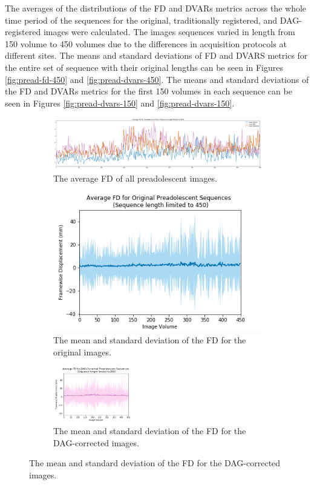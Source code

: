 The averages of the distributions of the FD and DVARs metrics across the whole time period of the sequences for the original, traditionally registered, and DAG-registered images were calculated. The images sequences varied in length from 150 volume to 450 volumes due to the differences in acquisition protocols at different sites. The means and standard deviations of FD and DVARS metrics for the entire set of sequence with their original lengths can be seen in Figures \ref{fig:pread-fd-450} and \ref{fig:pread-dvars-450}. The means and standard deviations of the FD and DVARs metrics for the first 150 volumes in each sequence can be seen in Figures \ref{fig:pread-dvars-150} and \ref{fig:pread-dvars-150}. 

\begin{figure}[t]
	\centering
	\begin{subfigure}{0.8\textwidth}
		\centering
		\includegraphics[width=1.0\textwidth]{6/figures/pread_fd_all_450_avg.png}
		\caption{The average FD of all preadolescent images.}
	\end{subfigure}

	\begin{subfigure}{0.9\textwidth}
		\centering
		\includegraphics[width=.4\textwidth]{6/figures/pread-bold-fd-450.png}
		\caption{The mean and standard deviation of the FD for the original images.}
	\end{subfigure}
	
	\begin{subfigure}{0.9\textwidth}
		\centering
		\includegraphics[width=0.4\textwidth]{6/figures/pread-dag-fd-450.png}
		\caption{The mean and standard deviation of the FD for the DAG-corrected images.}
	\end{subfigure}
	

\end{figure}
